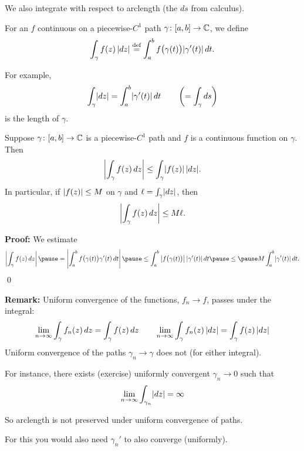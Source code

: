 \documentclass[10pt,aspectratio=169]{beamer}
\begin{document}
\begin{frame}
We also integrate with respect to arclength (the $ds$ from calculus).

\medskip
\pause

For an $f$ continuous on a piecewise-$C^1$ path $\gamma \colon [a,b] \to {\mathbb{C}}$,
we define
\[
\int_\gamma f(z) \, \lvert {dz} \rvert
\overset{\text{def}}{=}
\int_a^b f\bigl( \gamma(t) \bigr) \lvert {\gamma'(t)} \rvert \, dt .
\]

\pause

For example,
\[
\int_\gamma \lvert {dz} \rvert =
\int_a^b \lvert {\gamma'(t)} \rvert \, dt
\qquad
\left(
=
\int_\gamma ds \right)
\]
is the length of $\gamma$.
\end{frame}

\begin{frame}
\begin{proposition}
Suppose $\gamma \colon [a,b] \to {\mathbb{C}}$ is 
a piecewise-$C^1$ path and $f$ is a continuous function on
$\gamma$.  Then
\begin{equation*}
\left\lvert {\int_\gamma f(z) \, dz} \right\rvert \leq \int_\gamma \lvert {f(z)} \rvert \, \lvert {dz} \rvert .
\end{equation*}
\pause
In particular, if $\lvert {f(z)} \rvert \leq M$ on $\gamma$ and $\ell = \int_{\gamma} \lvert {dz} \rvert$, then
\begin{equation*}
\left\lvert {\int_\gamma f(z) \, dz} \right\rvert \leq M \ell .
\end{equation*}
\end{proposition} 
\pause

\textbf{Proof:}
We estimate
\[
\abs{\int_\gamma f(z) \, dz}
\pause
=
\abs{\int_a^b f\bigl( \gamma(t) \bigr) \gamma'(t) \, dt}
\pause
\leq
\int_a^b \abs{ f\bigl( \gamma(t) \bigr) }  \sabs{ \gamma'(t) } \, dt
\pause
\leq
\pause
M
\int_a^b \sabs{ \gamma'(t) } \, dt .
\]
\qed
\end{frame}

\begin{frame}
\textbf{Remark:}
Uniform convergence of the functions, $f_n \to f$, passes under the
integral:
\[
\lim_{n\to\infty} \int_{\gamma} f_n(z) \, dz
=
\int_{\gamma} f(z) \, dz
\qquad
\lim_{n\to\infty} \int_{\gamma} f_n(z) \, \lvert {dz} \rvert
=
\int_{\gamma} f(z) \, \lvert {dz} \rvert
\]
\pause
Uniform convergence of the paths $\gamma_n \to \gamma$ does not (for either
integral).

\pause
\medskip
For instance, there exists (exercise) uniformly convergent $\gamma_n \to 0$ such that
\[
\lim_{n\to\infty} \int_{\gamma_n} \lvert {dz} \rvert = \infty
\]

\pause

So arclength is not preserved under uniform convergence of paths.

\medskip
\pause

For this you would also need $\gamma_n'$ to also converge (uniformly).
\end{frame}
\end{document}
